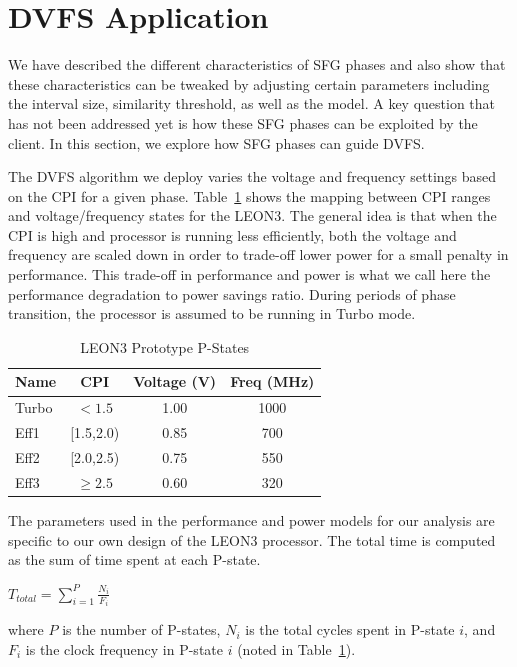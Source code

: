 \section{DVFS Application}

We have described the different characteristics of SFG phases and also show that these characteristics can be tweaked by adjusting certain parameters including the interval size, similarity threshold, as well as the model. A key question that has not been addressed yet is how these SFG phases can be exploited by the client. In this section, we explore how SFG phases can guide DVFS. 

The DVFS algorithm we deploy varies the voltage and frequency settings based on the CPI for a given phase. Table~\ref{tab:pstates} shows the mapping between CPI ranges and voltage/frequency states for the LEON3. The general idea is that when the CPI is high and processor is running less efficiently, both the voltage and frequency are scaled down in order to trade-off lower power for a small penalty in performance. This trade-off in performance and power is what we call here the performance degradation to power savings ratio. During periods of phase transition, the processor is assumed to be running in Turbo mode. 

\begin{table}[ht]
\caption{LEON3 Prototype P-States}
\label{tab:pstates}
\centering
\begin{tabular}{|l|c|c|c|}
\hline
\textbf{Name} & \textbf{CPI} &  \textbf{Voltage (V)} & \textbf{Freq (MHz)}   \\ \hline \hline
 Turbo & $< 1.5$ & 1.00 & 1000  \\ \hline
 Eff1 & [1.5,2.0) & 0.85 & 700  \\ \hline
 Eff2 & [2.0,2.5) & 0.75 & 550   \\ \hline
 Eff3 & $\geq 2.5$ & 0.60 & 320   \\ \hline
\end{tabular}
\end{table}

The parameters used in the performance and power models for our analysis are specific to our own design of the LEON3 processor. The total time is computed as the sum of time spent at each P-state.

\begin{center}
$T_{total} = \sum\limits_{i=1}^P \frac{N_i}{F_i}$
\end{center}

where $P$ is the number of P-states, $N_i$ is the total cycles spent in P-state $i$, and $F_i$ is the clock frequency in P-state $i$ (noted in Table~\ref{tab:pstates}). 


